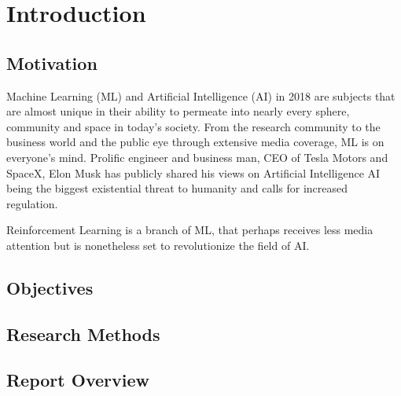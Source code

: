 \chapter{Introduction}

\section{Motivation}
Machine Learning (ML) and Artificial Intelligence (AI) in 2018 are subjects that are almost unique in their ability to permeate into nearly every sphere, community and space in today's society. From the research community to the business world and the public eye through extensive media coverage, ML is on everyone's mind. Prolific engineer and business man, CEO of Tesla Motors and SpaceX, Elon Musk has publicly shared his views on Artificial Intelligence AI being the biggest existential threat to humanity and calls for increased regulation. %

Reinforcement Learning is a branch of ML, that perhaps receives less media attention but is nonetheless set to revolutionize the field of AI. 
\section{Objectives}

\section{Research Methods}

\section{Report Overview}
